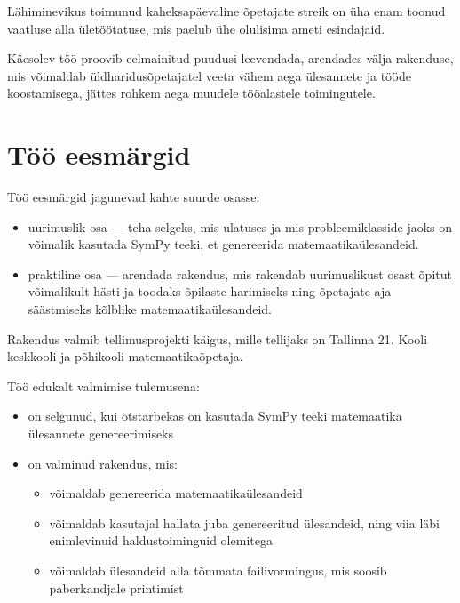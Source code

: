 Lähiminevikus toimunud kaheksapäevaline õpetajate streik \cite{hm-opetajate-streik} on üha enam toonud vaatluse alla ületöötatuse, mis paelub ühe olulisima ameti esindajaid. 

Käesolev töö proovib eelmainitud puudusi leevendada, arendades välja rakenduse, mis võimaldab üldharidusõpetajatel veeta vähem aega ülesannete ja tööde koostamisega, jättes rohkem aega muudele tööalastele toimingutele.

\section{Töö eesmärgid}

Töö eesmärgid jagunevad kahte suurde osasse: 
\begin{itemize}
  \item uurimuslik osa — teha selgeks, mis ulatuses ja mis probleemiklasside jaoks on võimalik kasutada SymPy teeki, et genereerida matemaatikaülesandeid.
  \item praktiline osa — arendada rakendus, mis rakendab uurimuslikust osast õpitut võimalikult hästi ja toodaks õpilaste harimiseks ning õpetajate aja säästmiseks kõlblike matemaatikaülesandeid.
\end{itemize}

Rakendus valmib tellimusprojekti käigus, mille tellijaks on Tallinna 21. Kooli keskkooli ja põhikooli matemaatikaõpetaja.

Töö edukalt valmimise tulemusena:

\begin{itemize}
  \item on selgunud, kui otstarbekas on kasutada SymPy teeki matemaatika ülesannete genereerimiseks
  \item on valminud rakendus, mis:
  \begin{itemize}
    \item võimaldab genereerida matemaatikaülesandeid
    \item võimaldab kasutajal hallata juba genereeritud ülesandeid, ning viia läbi enimlevinuid haldustoiminguid olemitega
    \item võimaldab ülesandeid alla tõmmata failivormingus, mis soosib paberkandjale printimist
  \end{itemize}
\end{itemize}

